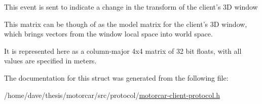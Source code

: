 This event is sent to indicate a change in the transform of the client's 3\-D window

This matrix can be though of as the model matrix for the client's 3\-D window, which brings vectors from the window local space into world space.

It is represented here as a column-\/major 4x4 matrix of 32 bit floats, with all values are specified in meters. 

The documentation for this struct was generated from the following file\-:\begin{DoxyCompactItemize}
\item 
/home/dave/thesis/motorcar/src/protocol/\hyperlink{motorcar-client-protocol_8h}{motorcar-\/client-\/protocol.\-h}\end{DoxyCompactItemize}
